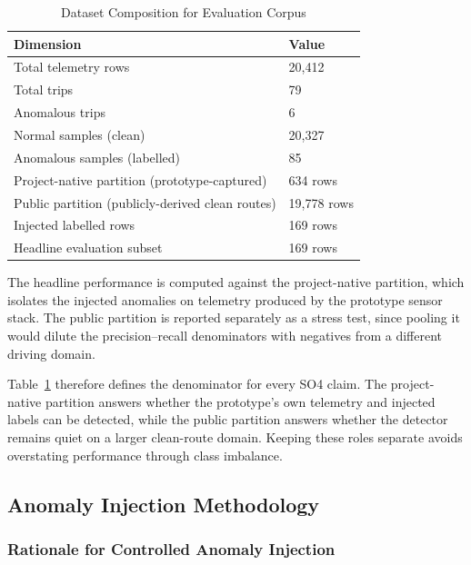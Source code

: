 \addtocounter{table}{-1}
\begin{table}[!htbp]
\centering
\caption{Dataset Composition for Evaluation Corpus}
\label{tab:dataset_composition}
\scriptsize
\begin{tabular}{|p{}|p{}|}
\hline
\textbf{Dimension} & \textbf{Value} \\
\hline
Total telemetry rows & 20{,}412 \\
\hline
Total trips & 79 \\
\hline
Anomalous trips & 6 \\
\hline
Normal samples (clean) & 20{,}327 \\
\hline
Anomalous samples (labelled) & 85 \\
\hline
Project-native partition (prototype-captured) & 634 rows \\
\hline
Public partition (publicly-derived clean routes) & 19{,}778 rows \\
\hline
Injected labelled rows & 169 rows \\
\hline
Headline evaluation subset & 169 rows \\
\hline
\end{tabular}
\normalsize
\end{table}

The headline performance is computed against the project-native partition, which isolates the injected anomalies on telemetry produced by the prototype sensor stack. The public partition is reported separately as a stress test, since pooling it would dilute the precision--recall denominators with negatives from a different driving domain.

Table~\ref{tab:dataset_composition} therefore defines the denominator for every SO4 claim. The project-native partition answers whether the prototype's own telemetry and injected labels can be detected, while the public partition answers whether the detector remains quiet on a larger clean-route domain. Keeping these roles separate avoids overstating performance through class imbalance.

\subsection{Anomaly Injection Methodology}
\label{sec:anomaly_injection}

\subsubsection{Rationale for Controlled Anomaly Injection}
\label{sec:why_injection}

